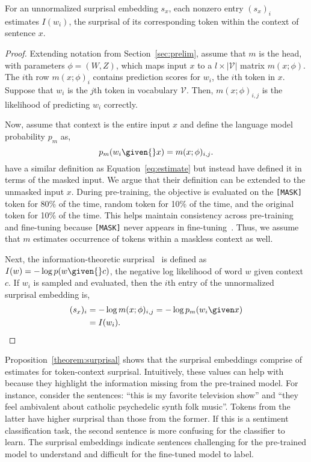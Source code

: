 \begin{theorem}
\label{theorem:surprisal}
For an unnormalized surprisal embedding $s_x$,
each nonzero entry $(s_x)_i$ estimates $I(w_i)$, the surprisal of its
corresponding token within the context of sentence $x$.
\end{theorem}


\begin{proof}
Extending notation from Section~\ref{sec:prelim}, assume that $m$ is the \mlm{} head, with parameters $\phi = (W,
Z)$, which maps
input $x$ to a $l \times |\mathcal{V}|$ matrix $m(x;\phi)$. The $i$th row
$m(x;\phi)_i$
contains prediction scores for $w_i$, the $i$th token in $x$.  Suppose that
$w_i$ is the $j$th token in vocabulary $\mathcal{V}$.
Then, $m(x;\phi)_{i,j}$ is the
likelihood of predicting $w_i$ correctly.

Now, assume that context is the entire input $x$ and define the language model
probability $p_{m}$ as,
\begin{equation}
    p_{m}(w_i \given{} x) = m(x; \phi)_{i,j}.
\label{eq:estimate}
\end{equation}
\citet{salazar-2020} have a similar definition as Equation~\ref{eq:estimate}
but instead have defined it in terms of the masked input.  We argue that
their definition can be extended to the unmasked input $x$. During
\bert{} pre-training, the \mlm{} objective is evaluated on the
\texttt{[MASK]} token for 80\% of the time, random token for 10\% of the
time, and the original token for 10\% of the time. This helps maintain
consistency across pre-training and fine-tuning because \texttt{[MASK]} never appears in
fine-tuning~\citep{devlin-2019}.  Thus, we assume that $m$ estimates occurrence of tokens within a maskless
context as well.

Next, the information-theoretic surprisal~\citep{shannon-1948} is defined as $I(w) = -\log p
(w \given{} c)$, the negative log likelihood of word $w$ given context $c$.
If $w_i$ is sampled and evaluated, then the $i$th entry
of the unnormalized surprisal embedding is,
\begin{align*}
    (s_x)_i &= - \log m(x; \phi)_{i,j} = - \log p_m(w_i \given x) \\
            &= I(w_i).
\end{align*}
\end{proof}

Proposition~\ref{theorem:surprisal} shows that the surprisal embeddings comprise
of estimates for token-context surprisal. Intuitively, these values can help
with \al{} because they highlight the information missing from the pre-trained
model.
For instance, consider the sentences: ``this is my favorite television show''
and ``they feel ambivalent about catholic psychedelic synth folk music''.
Tokens from the latter have higher surprisal than those from the former.  If this is a
sentiment classification task, the second sentence is more confusing for
the classifier to learn.  The surprisal embeddings indicate
sentences challenging for the pre-trained model to understand and
difficult for the fine-tuned model to label.


